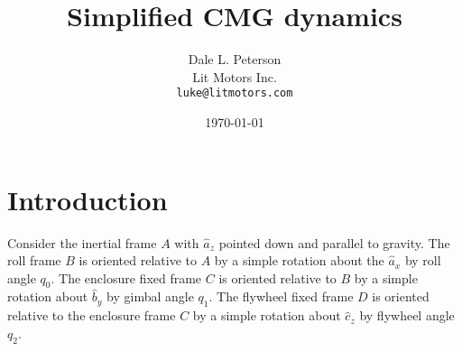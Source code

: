 \documentclass[11pt,letterpaper]{article}
\begin{document}
\title{Simplified CMG dynamics}
\author{Dale L. Peterson\\
        Lit Motors Inc.\\
        \texttt{luke@litmotors.com}}
\date{\today}

\maketitle
{}

\section{Introduction}
Consider the inertial frame $A$ with $\hat{a}_z$ pointed down and parallel to
gravity.  The roll frame $B$ is oriented relative to $A$ by a simple rotation
about the $\hat{a}_x$ by roll angle $q_0$. The enclosure fixed frame $C$ is
oriented relative to $B$ by a simple rotation about $\hat{b}_y$ by gimbal angle
$q_1$. The flywheel fixed frame $D$ is oriented relative to the enclosure frame
$C$ by a simple rotation about $\hat{c}_z$ by flywheel angle $q_2$.
\end{document}
